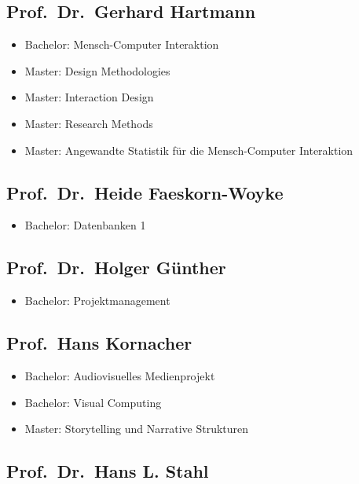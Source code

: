 \subsection{Prof.~Dr.~Gerhard
Hartmann}\label{prof.dr.gerhard-hartmann}

\begin{itemize}
\tightlist
\item
  Bachelor: Mensch-Computer Interaktion
\item
  Master: Design Methodologies
\item
  Master: Interaction Design
\item
  Master: Research Methods
\item
  Master: Angewandte Statistik für die Mensch-Computer Interaktion
\end{itemize}

\subsection{Prof.~Dr.~Heide
Faeskorn-Woyke}\label{prof.dr.heide-faeskorn-woyke}

\begin{itemize}
\tightlist
\item
  Bachelor: Datenbanken 1
\end{itemize}

\subsection{Prof.~Dr.~Holger
Günther}\label{prof.dr.holger-guxfcnther}

\begin{itemize}
\tightlist
\item
  Bachelor: Projektmanagement
\end{itemize}

\subsection{Prof.~Hans Kornacher}\label{prof.hans-kornacher}

\begin{itemize}
\tightlist
\item
  Bachelor: Audiovisuelles Medienprojekt
\item
  Bachelor: Visual Computing
\item
  Master: Storytelling und Narrative Strukturen
\end{itemize}

\subsection{Prof.~Dr.~Hans L. Stahl}\label{prof.dr.hans-l.-stahl}

